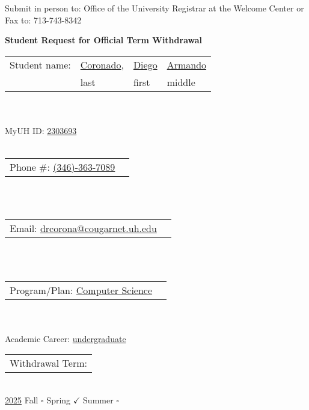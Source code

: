 \documentclass[11pt]{article}
\makeatletter
\newcommand{\lastName}{Coronado}
\newcommand{\firstName}{Diego}
\newcommand{\middleName}{Armando}
\newcommand{\studentID}{2303693}
\newcommand{\phoneNumber}{(346)-363-7089}
\newcommand{\emailAddress}{drcorona@cougarnet.uh.edu}
\newcommand{\programPlan}{Computer Science}
\newcommand{\academicCareer}{undergraduate}
\newcommand{\withdrawalYear}{2025}
\newcommand{\seasonFall}{\square}
\newcommand{\seasonSpring}{\checkmark}
\newcommand{\seasonSummer}{\square}
\makeatother
\begin{document}
\thispagestyle{empty}

\begin{minipage}{1\textwidth}
  Submit in person to:
  Office of the University Registrar at
  the Welcome Center
  or
  Fax to: 713-743-8342
\end{minipage}

\begin{center}
  \textbf{\Large Student Request for Official Term Withdrawal}
\end{center}

\noindent\begin{tabular}{@{}p{1.2in}p{1in}p{1in}p{1in}@{}} 
Student name: & \underline{\lastName}, & \underline{\firstName} & \underline{\middleName}\\
 & \scriptsize{last} & \scriptsize{first} & \scriptsize{middle}\\
\end{tabular}
\\\\
\hfill MyUH ID: \underline{\studentID}
\\\\
\noindent\begin{tabular}{@{}p{2in}p{2in}@{}}
  Phone \#:   \underline{\phoneNumber} \\
\end{tabular}
\\\\
\noindent\begin{tabular}{@{}p{3in}p{4.5in}@{}}
Email: \underline{\emailAddress} \\
\end{tabular}
\\\\
\noindent\begin{tabular}{@{}p{3in}p{4.5in}@{}}
Program/Plan:  \underline{\programPlan} \\
\end{tabular}
\\\\
\hfill Academic Career: \underline{\academicCareer}
\\

\noindent\begin{tabular}{@{}p{1.8in}@{}}
Withdrawal Term: \\
\end{tabular}
\\
\underline{\withdrawalYear} \hspace{0.2in} Fall $\seasonFall$ \hspace{0.2in} Spring $\seasonSpring$ \hspace{0.2in} Summer $\seasonSummer$
\end{document}
